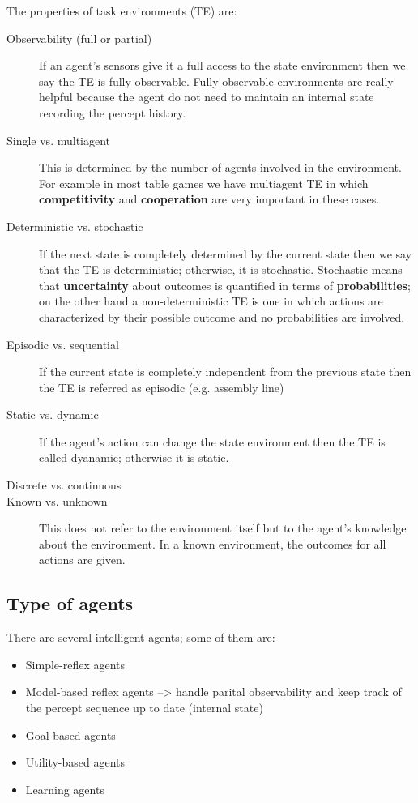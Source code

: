 \documentclass[a4paper, 11pt]{article}
\begin{document}
The properties of task environments (TE) are:
\begin{description}
  \item[Observability (full or partial)]
    If an agent's sensors give it a full access to the state environment then we say the TE is fully observable. Fully observable environments are really helpful
    because the agent do not need to maintain an internal state recording the percept history.
  \item[Single vs. multiagent]
    This is determined by the number of agents involved in the environment. For example in most table games we have multiagent TE in which \textbf{competitivity} and \textbf{cooperation} are very important in these cases.
  \item[Deterministic vs. stochastic]
    If the next state is completely determined by the current state then we say that the TE is deterministic; otherwise, it is stochastic.
    Stochastic means that \textbf{uncertainty} about outcomes is quantified in terms of \textbf{probabilities}; on the other hand a non-deterministic TE is one in which actions are characterized by their possible outcome and no probabilities are involved.
  \item[Episodic vs. sequential]
    If the current state is completely independent from the previous state then the TE is referred as episodic (e.g. assembly line)
  \item[Static vs. dynamic]
    If the agent's action can change the state environment then the TE is called dyanamic; otherwise it is static.
  \item[Discrete vs. continuous]
  \item[Known vs. unknown]
    This does not refer to the environment itself but to the agent's knowledge about the environment. In a known environment, the outcomes for all actions are given.
\end{description}

\subsection*{Type of agents}
There are several intelligent agents; some of them are:
\begin{itemize}
  \item Simple-reflex agents
  \item Model-based reflex agents --> handle parital observability and keep track of the percept sequence up to date (internal state)
  \item Goal-based agents
  \item Utility-based agents
  \item Learning agents
\end{itemize}
\end{document}
